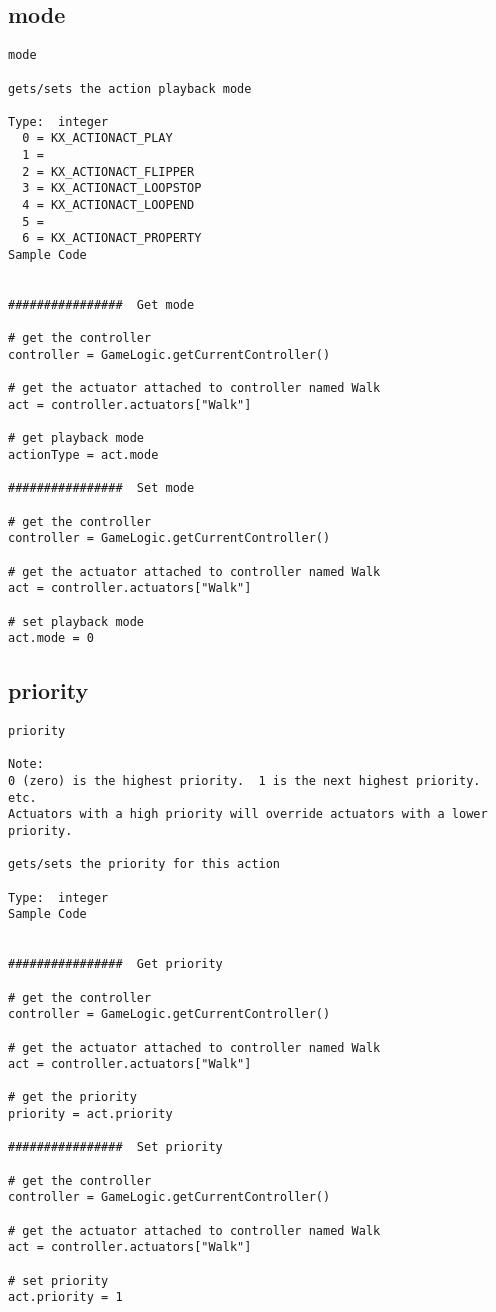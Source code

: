 \subsection{mode}
\begin{verbatim}
mode

gets/sets the action playback mode

Type:  integer
  0 = KX_ACTIONACT_PLAY
  1 =
  2 = KX_ACTIONACT_FLIPPER
  3 = KX_ACTIONACT_LOOPSTOP
  4 = KX_ACTIONACT_LOOPEND
  5 =
  6 = KX_ACTIONACT_PROPERTY
Sample Code


################  Get mode

# get the controller
controller = GameLogic.getCurrentController()

# get the actuator attached to controller named Walk
act = controller.actuators["Walk"]

# get playback mode
actionType = act.mode

################  Set mode

# get the controller
controller = GameLogic.getCurrentController()

# get the actuator attached to controller named Walk
act = controller.actuators["Walk"]

# set playback mode
act.mode = 0
\end{verbatim}


\subsection{priority}
\begin{verbatim}
priority

Note:
0 (zero) is the highest priority.  1 is the next highest priority.  etc.
Actuators with a high priority will override actuators with a lower priority.

gets/sets the priority for this action

Type:  integer
Sample Code


################  Get priority

# get the controller
controller = GameLogic.getCurrentController()

# get the actuator attached to controller named Walk
act = controller.actuators["Walk"]

# get the priority
priority = act.priority

################  Set priority

# get the controller
controller = GameLogic.getCurrentController()

# get the actuator attached to controller named Walk
act = controller.actuators["Walk"]

# set priority
act.priority = 1
\end{verbatim}


